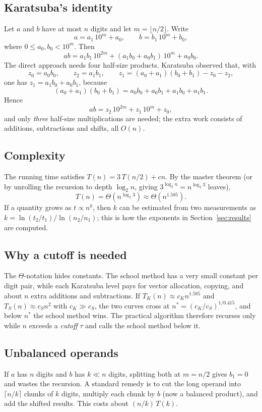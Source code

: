\documentclass[11pt,a4paper]{article}
\begin{document}
\subsection{Karatsuba's identity}
Let $a$ and $b$ have at most $n$ digits and let $m=\lfloor n/2\rfloor$. Write
\[
a = a_1\,10^{m}+a_0,\qquad b = b_1\,10^{m}+b_0,
\]
where $0\le a_0,b_0<10^m$. Then
\[
ab = a_1b_1\,10^{2m} + (a_1b_0+a_0b_1)\,10^{m} + a_0b_0 .
\]
The direct approach needs four half-size products. Karatsuba observed that, with
\[
z_0=a_0b_0,\qquad z_2=a_1b_1,\qquad z_1=(a_0+a_1)(b_0+b_1)-z_0-z_2,
\]
one has $z_1=a_1b_0+a_0b_1$, because
\[
(a_0+a_1)(b_0+b_1)=a_0b_0+a_0b_1+a_1b_0+a_1b_1 .
\]
Hence
\begin{equation}
ab = z_2\,10^{2m} + z_1\,10^{m} + z_0 ,
\label{eq:kara}
\end{equation}
and only \emph{three} half-size multiplications are needed; the extra work consists of additions, subtractions and shifts, all $O(n)$.

\subsection{Complexity}
The running time satisfies $T(n)=3\,T(n/2)+cn$. By the master theorem (or by unrolling the recursion to depth $\log_2 n$, giving $3^{\log_2 n}=n^{\log_2 3}$ leaves),
\[
T(n)=\Theta\!\left(n^{\log_2 3}\right)\approx\Theta\!\left(n^{1.585}\right).
\]
If a quantity grows as $t\propto n^k$, then $k$ can be estimated from two measurements as $k=\ln(t_2/t_1)/\ln(n_2/n_1)$; this is how the exponents in Section~\ref{sec:results} are computed.

\subsection{Why a cutoff is needed}
The $\Theta$-notation hides constants. The school method has a very small constant per digit pair, while each Karatsuba level pays for vector allocation, copying, and about $n$ extra additions and subtractions. If $T_K(n)\approx c_K n^{1.585}$ and $T_S(n)\approx c_S n^{2}$ with $c_K\gg c_S$, the two curves cross at $n^\ast=(c_K/c_S)^{1/0.415}$, and below $n^\ast$ the school method wins. The practical algorithm therefore recurses only while $n$ exceeds a \emph{cutoff} $\tau$ and calls the school method below it.

\subsection{Unbalanced operands}
If $a$ has $n$ digits and $b$ has $k\ll n$ digits, splitting both at $m=n/2$ gives $b_1=0$ and wastes the recursion. A standard remedy is to cut the long operand into $\lceil n/k\rceil$ chunks of $k$ digits, multiply each chunk by $b$ (now a balanced product), and add the shifted results. This costs about $(n/k)\,T(k)$.
\end{document}
